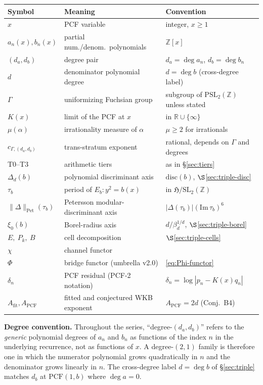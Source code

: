 \documentclass[11pt,a4paper]{article}
\theoremstyle{definition}
\theoremstyle{remark}
\newcommand{\PSLZ}{\mathrm{PSL}_2(\mathbb{Z})}
\newcommand{\PCF}{\mathrm{PCF}}
\newcommand{\Z}{\mathbb{Z}}
\newcommand{\R}{\mathbb{R}}
\newcommand{\HH}{\mathfrak{H}}
\newcommand{\PetN}[1]{\lVert #1 \rVert_{\mathrm{Pet}}}
\begin{document}
\begin{center}
\begin{tabular}{@{}lll@{}}
\toprule
Symbol & Meaning & Convention \\
\midrule
$x$ & PCF variable & integer, $x \geq 1$ \\
$a_n(x), b_n(x)$ & partial num./denom.\ polynomials & $\Z[x]$ \\
$(d_a, d_b)$ & degree pair & $d_a = \deg a_n$, $d_b = \deg b_n$ \\
$d$ & denominator polynomial degree & $d = \deg b$ (cross-degree label) \\
$\Gamma$ & uniformizing Fuchsian group & subgroup of $\PSLZ$ unless stated \\
$K(x)$ & limit of the PCF at $x$ & in $\R \cup \{\infty\}$ \\
$\mu(\alpha)$ & irrationality measure of $\alpha$ & $\mu \geq 2$ for irrationals \\
$c_{\Gamma,(d_a,d_b)}$ & trans-stratum exponent & rational, depends on $\Gamma$ and degrees \\
T0--T3 & arithmetic tiers & as in \S\ref{sec:tiers} \\
$\Delta_d(b)$ & polynomial discriminant axis & $\mathrm{disc}(b)$, $\S$\ref{sec:triple-disc} \\
$\tau_b$ & period of $E_b: y^2 = b(x)$ & in $\HH/\mathrm{SL}_2(\Z)$ \\
$\PetN{\Delta}(\tau_b)$ & Petersson modular-discriminant axis & $|\Delta(\tau_b)|(\mathrm{Im}\,\tau_b)^6$ \\
$\xi_0(b)$ & Borel-radius axis & $d/\beta_d^{1/d}$, $\S$\ref{sec:triple-borel} \\
$E,\ P_k,\ B$ & cell decomposition & $\S$\ref{sec:triple-cells} \\
$\chi$ & channel functor & \cite{CT} \\
$\Phi$ & bridge functor (umbrella v2.0) & \eqref{eq:Phi-functor} \\
$\delta_n$ & PCF residual (PCF-2 notation) & $\delta_n = \log|p_n - K(x) q_n|$ \\
$A_{\mathrm{fit}}, A_{\mathrm{PCF}}$ & fitted and conjectured WKB exponent & $A_{\mathrm{PCF}} = 2d$ (Conj.~B4) \\
\bottomrule
\end{tabular}
\end{center}

\noindent
\textbf{Degree convention.} Throughout the series, ``degree-$(d_a, d_b)$''
refers to the \emph{generic} polynomial degrees of $a_n$ and $b_n$ as
functions of the index $n$ in the underlying recurrence, not as
functions of $x$. A degree-$(2,1)$ family is therefore one in which
the numerator polynomial grows quadratically in $n$ and the denominator
grows linearly in $n$. The cross-degree label $d = \deg b$ of
\S\ref{sec:triple} matches $d_b$ at $\PCF(1,b)$ where $\deg a = 0$.
\end{document}
